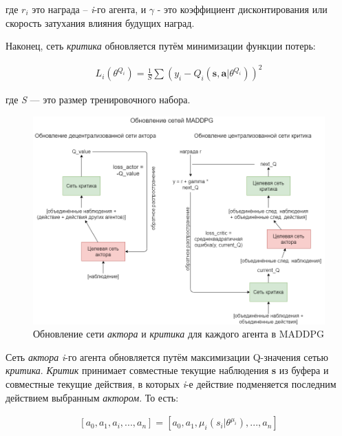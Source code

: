 где $r_i$ это награда – \textit{i}-го агента, и $\gamma$ - это коэффициент дисконтирования или скорость затухания влияния будущих наград.

Наконец, сеть \textit{критика} обновляется путём минимизации функции потерь:

\begin{equation}
    \begin{multlined}
        L_i(\theta^{Q_i}) = \frac{1}{S} \sum (y_i - Q_i(\mathbf{s, a}|\theta^{Q_i}))^2
    \end{multlined}
\end{equation}

где \textit{S} --- это размер тренировочного набора.

\begin{figure}[ht!]
    \center
    \includegraphics [scale=0.5] {my_folder/images/ch3/maddpg-updating-networks.png}
    \caption{Обновление сети \textit{актора} и \textit{критика} для каждого агента в MADDPG}
    \label{fig:ch3-network-training}
\end{figure}

Сеть \textit{актора} \textit{i}-го агента обновляется путём максимизации Q-значения сетью \textit{критика}. \textit{Критик} принимает совместные текущие наблюдения \textbf{s} из буфера и совместные текущие действия, в которых \textit{i}-е действие подменяется последним действием выбранным \textit{актором}. То есть:

\begin{equation}
    \begin{multlined}
    [a_0, a_1, a_i, ..., a_n]
        = [a_0, a_1, \mu_i(s_i|\theta^{\mu_i}), ..., a_n]
    \end{multlined}
\end{equation}

